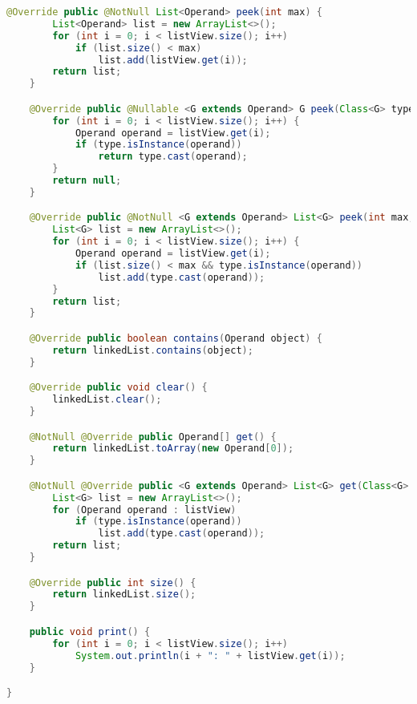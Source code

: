 \begin{lstlisting}[caption=OperandStack (Schwenke),label=list:OperandStack,language=Java]
    @Override public @NotNull List<Operand> peek(int max) {
        List<Operand> list = new ArrayList<>();
        for (int i = 0; i < listView.size(); i++)
            if (list.size() < max)
                list.add(listView.get(i));
        return list;
    }

    @Override public @Nullable <G extends Operand> G peek(Class<G> type) {
        for (int i = 0; i < listView.size(); i++) {
            Operand operand = listView.get(i);
            if (type.isInstance(operand))
                return type.cast(operand);
        }
        return null;
    }

    @Override public @NotNull <G extends Operand> List<G> peek(int max, Class<G> type) {
        List<G> list = new ArrayList<>();
        for (int i = 0; i < listView.size(); i++) {
            Operand operand = listView.get(i);
            if (list.size() < max && type.isInstance(operand))
                list.add(type.cast(operand));
        }
        return list;
    }

    @Override public boolean contains(Operand object) {
        return linkedList.contains(object);
    }

    @Override public void clear() {
        linkedList.clear();
    }

    @NotNull @Override public Operand[] get() {
        return linkedList.toArray(new Operand[0]);
    }

    @NotNull @Override public <G extends Operand> List<G> get(Class<G> type) {
        List<G> list = new ArrayList<>();
        for (Operand operand : listView)
            if (type.isInstance(operand))
                list.add(type.cast(operand));
        return list;
    }

    @Override public int size() {
        return linkedList.size();
    }

    public void print() {
        for (int i = 0; i < listView.size(); i++)
            System.out.println(i + ": " + listView.get(i));
    }

}

\end{lstlisting} 

